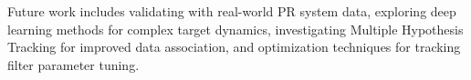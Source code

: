 \documentclass[conference]{IEEEtran}
\begin{document}
Future work includes validating with real-world PR system data, exploring deep learning methods for complex target dynamics, investigating Multiple Hypothesis Tracking for improved data association, and optimization techniques for tracking filter parameter tuning.



\end{document}
